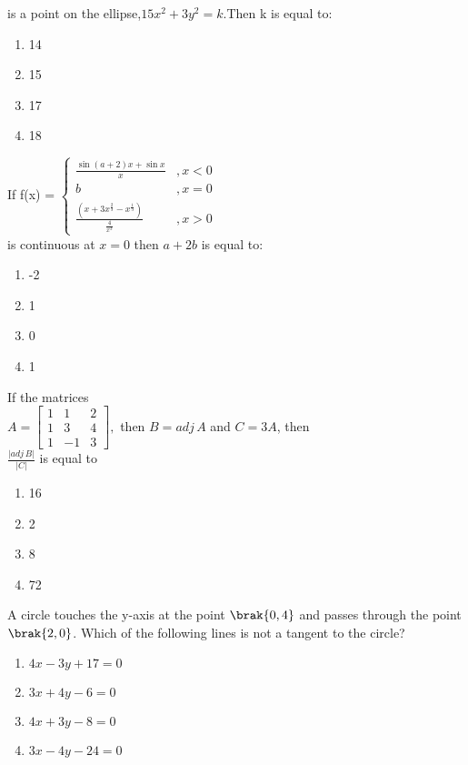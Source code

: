   is a point on the ellipse,$15x^{2}+3y^{2}=k$.Then k is equal to$\colon$ \hfill{}
   \begin{enumerate}
       \item 14
       \item 15
       \item 17
       \item 18
   \end{enumerate}
\item If f(x) =
$\begin{cases}
\frac{\sin(a+2)x + \sin x}{x}&,x < 0 \\
b&,x = 0 \\
\frac{(x + 3x^{\frac{2}{3}} - x^{\frac{1}{3}})}{\frac{4}{x^3}}&,x > 0
\end{cases}$\\is continuous at $x=0$ then $a+2b$ is equal to$\colon$ \hfill{}
\begin{enumerate}
    \item -2
    \item 1
    \item 0
    \item 1
\end{enumerate}
\item If the matrices\\
$A=\begin{bmatrix}
1&1&2\\1&3&4\\1&-1&3\end{bmatrix},$ then $B=adj\,A$ and $C=3A$, then\\$\frac{\lvert adj\,B \rvert}{\lvert C \rvert}$ is equal to \hfill{}
\begin{enumerate}
    \item 16
    \item 2
    \item 8
    \item 72
\end{enumerate}
\item A circle touches the y-axis at the point $\brak{0,4}$ and passes through the point $\brak{2,0}$. Which of the following lines is not a tangent to the circle? \hfill{}
\begin{enumerate}
    \item $4x-3y+17=0$
    \item $3x+4y-6=0$
    \item $4x+3y-8=0$
    \item $3x-4y-24=0$
\end{enumerate}

